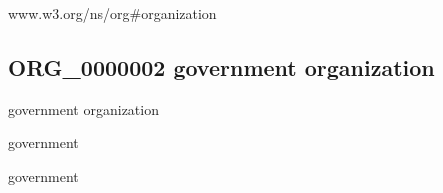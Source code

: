 \documentclass[letterpaper,10pt,english]{sphinxmanual}
\begin{document}
\begin{sphinxShadowBox}

\sphinxAtStartPar
{}

\sphinxAtStartPar
{}

\sphinxAtStartPar
{}

\sphinxAtStartPar
www.w3.org/ns/org\#organization

\sphinxAtStartPar
{}
\end{sphinxShadowBox}
\begin{quote}

\ignorespaces \end{quote}


\subsection{ORG\_0000002 \sphinxhyphen{} government organization}
\label{\detokenize{doc-ORG_0000002:org-0000002-government-organization}}\label{\detokenize{doc-ORG_0000002:index-0}}\label{\detokenize{doc-ORG_0000002::doc}}
\begin{sphinxShadowBox}

\sphinxAtStartPar
government organization
\end{sphinxShadowBox}

\begin{sphinxShadowBox}

\sphinxAtStartPar
government
\end{sphinxShadowBox}

\begin{sphinxShadowBox}

\sphinxAtStartPar
government
\end{sphinxShadowBox}

\begin{sphinxShadowBox}

\sphinxAtStartPar
{\hyperref[\detokenize{doc-ORG_0000001::doc}]{}}
\end{sphinxShadowBox}
\end{document}
